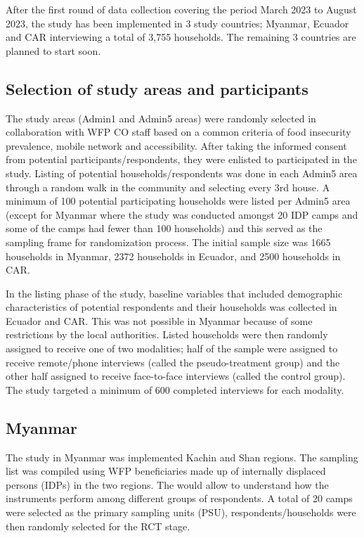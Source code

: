 \documentclass[11pt,harvard]{article}
\begin{document}
After the first round of data collection covering the period March 2023 to August 2023, the study has been implemented in 3 study countries; Myanmar, Ecuador and CAR interviewing a total of 3,755 households. The remaining 3 countries are planned to start soon.

	\subsection{Selection of study areas and participants}

The study areas (Admin1 and Admin5 areas) were randomly selected in collaboration with WFP CO staff based on a common criteria of food insecurity prevalence, mobile network and accessibility.
After taking the informed consent from potential participants/respondents, they were enlisted to participated in the study. Listing of potential households/respondents was done in each Admin5 area through a random walk in the community and selecting every 3rd house. A minimum of 100 potential participating households were listed per Admin5 area (except for Myanmar where the study was conducted amongst 20 IDP camps and some of the camps had fewer than 100 households) and this served as the sampling frame for randomization process. The initial sample size was 1665 households in Myanmar, 2372 households in Ecuador, and 2500 households in CAR. 

In the listing phase of the study, baseline variables that included demographic characteristics of potential respondents and their households was collected in Ecuador and CAR. This was not possible in Myanmar because of some restrictions by the local authorities. Listed households were then randomly assigned to receive one of two modalities; half of the sample were assigned to receive remote/phone interviews (called the pseudo-treatment group) and the other half assigned to receive face-to-face interviews (called the control group). The study targeted a minimum of 600 completed interviews for each modality.

	\subsection{Myanmar}
	
The study in Myanmar was implemented Kachin and Shan regions. The sampling list was compiled using WFP beneficiaries made up of internally displaced persons (IDPs) in the two regions. The would allow to understand how the instruments perform among different groups of respondents. A total of 20 camps were selected as the primary sampling units (PSU), respondents/households were then randomly selected for the RCT stage. 
\end{document}

